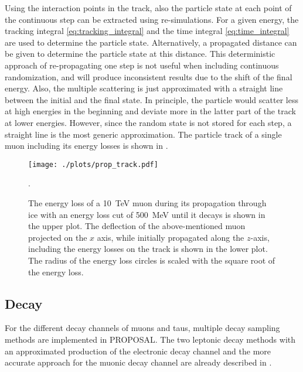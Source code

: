 Using the interaction points in the track, also the particle state at each point of the continuous step can be extracted using re-simulations.
For a given energy, the tracking integral \eqref{eq:tracking_integral} and the time integral \eqref{eq:time_integral} are used to determine the particle state.
Alternatively, a propagated distance can be given to determine the particle state at this distance.
This deterministic approach of re-propagating one step is not useful when including continuous randomization, and will produce inconsistent results due to the shift of the final energy.
Also, the multiple scattering is just approximated with a straight line between the initial and the final state.
In principle, the particle would scatter less at high energies in the beginning and deviate more in the latter part of the track at lower energies.
However, since the random state is not stored for each step, a straight line is the most generic approximation.
The particle track of a single muon including its energy losses is shown in .
\begin{figure}[H]
    \centering
    \texttt{[image: ./plots/prop\_track.pdf]}
    \caption{The energy loss of a \SI{10}{TeV} muon during its propagation through ice with an energy loss cut of \SI{500}{MeV} until it decays is shown in the upper plot. The deflection of the above-mentioned muon projected on the $x$ axis, while initially propagated along the $z$-axis, including the energy losses on the track is shown in the lower plot. The radius of the energy loss circles is scaled with the square root of the energy loss.}
    \label{fig:prop_track}.
\end{figure}

%

\subsection{Decay}

For the different decay channels of muons and taus, multiple decay sampling methods are implemented in PROPOSAL.
The two leptonic decay methods with an approximated production of the electronic decay channel and the more accurate approach for the muonic decay channel are already described in .


